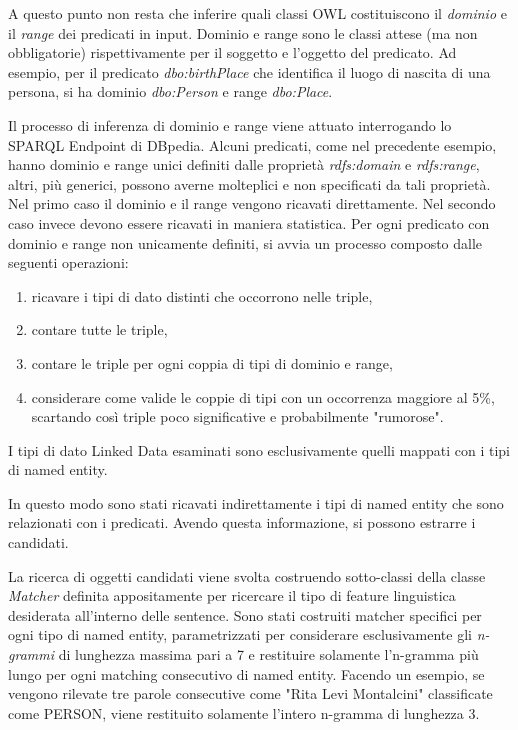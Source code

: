 A questo punto non resta che inferire quali classi OWL costituiscono il \textit{dominio} e il \textit{range} dei predicati in input. Dominio e range sono le classi attese (ma non obbligatorie) rispettivamente per il soggetto e l'oggetto del predicato.
Ad esempio, per il predicato \textit{dbo:birthPlace} che identifica il luogo di nascita di una persona, si ha dominio \textit{dbo:Person} e range \textit{dbo:Place}.

Il processo di inferenza di dominio e range viene attuato interrogando lo SPARQL Endpoint di DBpedia.
Alcuni predicati, come nel precedente esempio, hanno dominio e range unici definiti dalle proprietà \textit{rdfs:domain} e \textit{rdfs:range}, altri, più generici, possono averne molteplici e non specificati da tali proprietà. 
Nel primo caso il dominio e il range vengono ricavati direttamente. 
Nel secondo caso invece devono essere ricavati in maniera statistica. Per ogni predicato con dominio e range non unicamente definiti, si avvia un processo composto dalle seguenti operazioni:
\begin{enumerate}
\item ricavare i tipi di dato distinti che occorrono nelle triple,
\item contare tutte le triple,
\item contare le triple per ogni coppia di tipi di dominio e range,
\item considerare come valide le coppie di tipi con un occorrenza maggiore al 5\%, scartando così triple poco significative e probabilmente "rumorose".
\end{enumerate}

I tipi di dato Linked Data esaminati sono esclusivamente quelli mappati con i tipi di named entity. 

In questo modo sono stati ricavati indirettamente i tipi di named entity che sono relazionati con i predicati. Avendo questa informazione, si possono estrarre i candidati.

La ricerca di oggetti candidati viene svolta costruendo sotto-classi della classe \textit{Matcher} definita appositamente per ricercare il tipo di feature linguistica desiderata all'interno delle sentence. Sono stati costruiti matcher specifici per ogni tipo di named entity, parametrizzati per considerare esclusivamente gli \textit{n-grammi} di lunghezza massima pari a 7 e restituire solamente l'n-gramma più lungo per ogni matching consecutivo di named entity. Facendo un esempio, se vengono rilevate tre parole consecutive come "Rita Levi Montalcini" classificate come PERSON, viene restituito solamente l'intero n-gramma di lunghezza 3.

